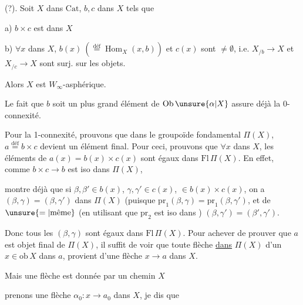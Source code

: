 
\uline{} (?). Soit $X$ dans $\mathrm{Cat}$,  $b,c$ dans $X$ tels que

a) $b\times c$ est dans $X$

b) $\forall x$ dans $X$, $b(x)\ (\overset{\text{déf}}{=}\operatorname{Hom}_{X}(x,b))$ et $c(x)$ sont $\ne\emptyset$, i.e. $X_{/b}\longrightarrow X$ et $X_{/c}\longrightarrow X$ sont surj. sur les objets.

Alors $X$ est $W_\infty$-asphérique.


Le fait que $b$ soit un plus grand élément de $\mathrm{Ob}\,\unsure{\alpha|X}$ assure déjà la 0-connexité.

Pour la 1-connexité, prouvons que dans le groupoïde fondamental $\Pi(X)$, $a\overset{\text{déf}}{=}b\times c$ devient un élément final. Pour ceci, prouvons  que $\forall x$ dans $X$,  les éléments de $a(x)=b(x)\times c(x)$ sont égaux dans $\mathrm{Fl}\,\Pi(X)$. En effet, comme $b\times c\longrightarrow b$ est iso  dans $\Pi(X)$, 


montre déjà que  si $\beta,\beta'\in b(x)$, $\gamma,\gamma'\in c(x)$,   $\in b(x)\times c(x)$, on a $(\beta,\gamma)=(\beta,\gamma')$ dans $\Pi(X)$  (puisque $\mathrm{pr}_1(\beta,\gamma)=\mathrm{pr}_1(\beta,\gamma')$, et de $\unsure{=|\text{même}}$ (en utilisant que $\mathrm{pr}_2$ est iso dans ) $(\beta,\gamma')=(\beta',\gamma')$.

Donc tous les $(\beta,\gamma)$   sont égaux dans $\mathrm{Fl}\,\Pi(X)$. Pour achever de prouver que $a$ est objet final de $\Pi(X)$, il suffit de voir que toute flèche \uline{dans} $\Pi(X)$ d'un $x\in\mathrm{ob}\,X$ dans $a$, provient d'une flèche $x\longrightarrow a$ dans $X$.

Mais une  flèche  est donnée par un chemin  $X$


 prenons une flèche $\alpha_0:x\longrightarrow a_0$ dans $X$, je dis que 

